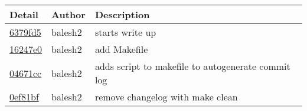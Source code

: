 \begin{tabular}{l l l}\textbf{Detail} & \textbf{Author} & \textbf{Description}\\\hline
\href{https://github.com/balesh2/CS444-3/commit/6379fd575b665ad1a2ee5b224fd9f2011d5eaa09}{6379fd5} & balesh2 & starts write up\\\hline
\href{https://github.com/balesh2/CS444-3/commit/16247e0cb5a258e35e2a2616ff265f9eb9d64c12}{16247e0} & balesh2 & add Makefile\\\hline
\href{https://github.com/balesh2/CS444-3/commit/04671cccc31a62456b362189b09d33da48325f88}{04671cc} & balesh2 & adds script to makefile to autogenerate commit log\\\hline
\href{https://github.com/balesh2/CS444-3/commit/0ef81bfb86aab3f1c19a59d3f83fcbba31187c9e}{0ef81bf} & balesh2 & remove changelog with make clean\\\hline\end{tabular}
